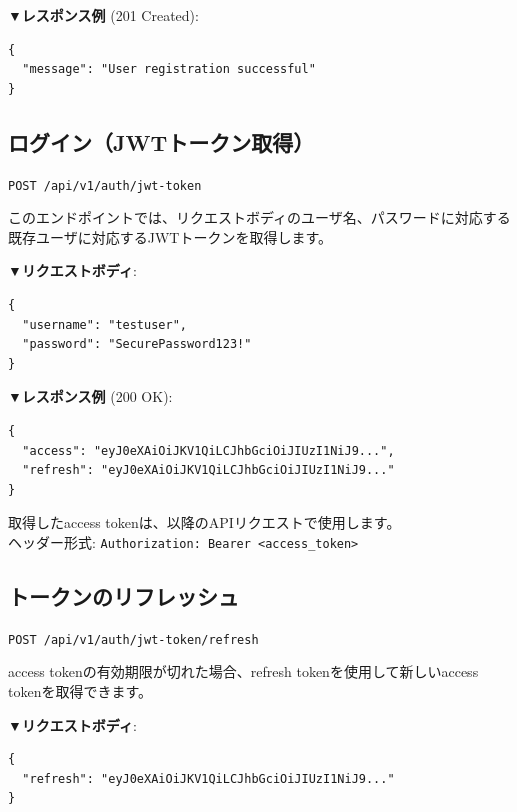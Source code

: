 \documentclass[11pt,a4paper]{ltjsarticle}  %
\begin{document}
\textbf{▼レスポンス例} (201 Created):
\begin{lstlisting}[style=json]
{
  "message": "User registration successful"
}
\end{lstlisting}

\subsection{ログイン（JWTトークン取得）}

\begin{tcolorbox}[colback=blue!5,colframe=blue!50!black,title=エンドポイント]
\texttt{POST /api/v1/auth/jwt-token}
\end{tcolorbox}

このエンドポイントでは、リクエストボディのユーザ名、パスワードに対応する既存ユーザに対応するJWTトークンを取得します。

\textbf{▼リクエストボディ}:
\begin{lstlisting}[style=json]
{
  "username": "testuser",
  "password": "SecurePassword123!"
}
\end{lstlisting}

\textbf{▼レスポンス例} (200 OK):
\begin{lstlisting}[style=json]
{
  "access": "eyJ0eXAiOiJKV1QiLCJhbGciOiJIUzI1NiJ9...",
  "refresh": "eyJ0eXAiOiJKV1QiLCJhbGciOiJIUzI1NiJ9..."
}
\end{lstlisting}

\begin{tcolorbox}[colback=green!10,colframe=green!50!black,title=実装のヒント]
取得したaccess tokenは、以降のAPIリクエストで使用します。\\
ヘッダー形式: \texttt{Authorization: Bearer <access\_token>}
\end{tcolorbox}

\subsection{トークンのリフレッシュ}

\begin{tcolorbox}[colback=blue!5,colframe=blue!50!black,title=エンドポイント]
\texttt{POST /api/v1/auth/jwt-token/refresh}
\end{tcolorbox}

access tokenの有効期限が切れた場合、refresh tokenを使用して新しいaccess tokenを取得できます。

\textbf{▼リクエストボディ}:
\begin{lstlisting}[style=json]
{
  "refresh": "eyJ0eXAiOiJKV1QiLCJhbGciOiJIUzI1NiJ9..."
}
\end{lstlisting}
\end{document}
